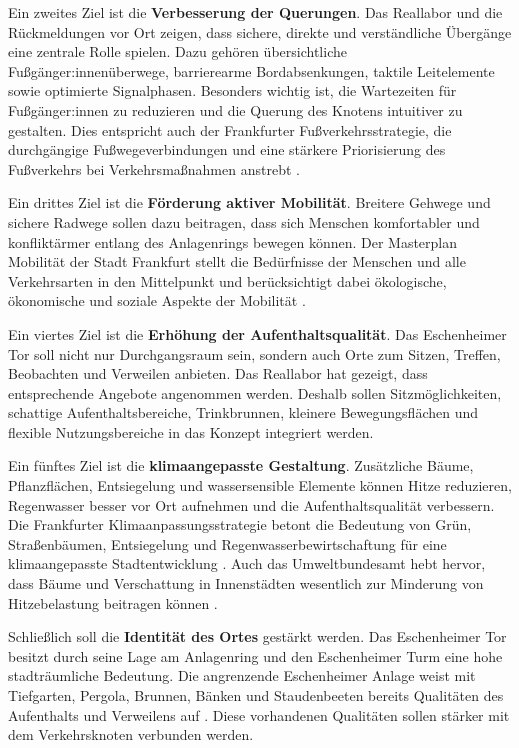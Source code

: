 \documentclass[a4paper,12pt]{article}
\begin{document}
Ein zweites Ziel ist die \textbf{Verbesserung der Querungen}. Das Reallabor und die Rückmeldungen vor Ort zeigen, dass sichere, direkte und verständliche Übergänge eine zentrale Rolle spielen. Dazu gehören übersichtliche Fußgänger:innenüberwege, barrierearme Bordabsenkungen, taktile Leitelemente sowie optimierte Signalphasen. Besonders wichtig ist, die Wartezeiten für Fußgänger:innen zu reduzieren und die Querung des Knotens intuitiver zu gestalten. Dies entspricht auch der Frankfurter Fußverkehrsstrategie, die durchgängige Fußwegeverbindungen und eine stärkere Priorisierung des Fußverkehrs bei Verkehrsmaßnahmen anstrebt \autocite{stadtfrankfurtfussverkehr2026}.

Ein drittes Ziel ist die \textbf{Förderung aktiver Mobilität}. Breitere Gehwege und sichere Radwege sollen dazu beitragen, dass sich Menschen komfortabler und konfliktärmer entlang des Anlagenrings bewegen können. Der Masterplan Mobilität der Stadt Frankfurt stellt die Bedürfnisse der Menschen und alle Verkehrsarten in den Mittelpunkt und berücksichtigt dabei ökologische, ökonomische und soziale Aspekte der Mobilität \autocite{stadtfrankfurtmasterplan2025}.

Ein viertes Ziel ist die \textbf{Erhöhung der Aufenthaltsqualität}. Das Eschenheimer Tor soll nicht nur Durchgangsraum sein, sondern auch Orte zum Sitzen, Treffen, Beobachten und Verweilen anbieten. Das Reallabor hat gezeigt, dass entsprechende Angebote angenommen werden. Deshalb sollen Sitzmöglichkeiten, schattige Aufenthaltsbereiche, Trinkbrunnen, kleinere Bewegungsflächen und flexible Nutzungsbereiche in das Konzept integriert werden.

Ein fünftes Ziel ist die \textbf{klimaangepasste Gestaltung}. Zusätzliche Bäume, Pflanzflächen, Entsiegelung und wassersensible Elemente können Hitze reduzieren, Regenwasser besser vor Ort aufnehmen und die Aufenthaltsqualität verbessern. Die Frankfurter Klimaanpassungsstrategie betont die Bedeutung von Grün, Straßenbäumen, Entsiegelung und Regenwasserbewirtschaftung für eine klimaangepasste Stadtentwicklung \autocite{stadtfrankfurtklimaanpassung2026}. Auch das Umweltbundesamt hebt hervor, dass Bäume und Verschattung in Innenstädten wesentlich zur Minderung von Hitzebelastung beitragen können \autocite{umweltbundesamt2022}.

Schließlich soll die \textbf{Identität des Ortes} gestärkt werden. Das Eschenheimer Tor besitzt durch seine Lage am Anlagenring und den Eschenheimer Turm eine hohe stadträumliche Bedeutung. Die angrenzende Eschenheimer Anlage weist mit Tiefgarten, Pergola, Brunnen, Bänken und Staudenbeeten bereits Qualitäten des Aufenthalts und Verweilens auf \autocite{stadtfrankfurteschenheimeranlage2026}. Diese vorhandenen Qualitäten sollen stärker mit dem Verkehrsknoten verbunden werden.
\end{document}
